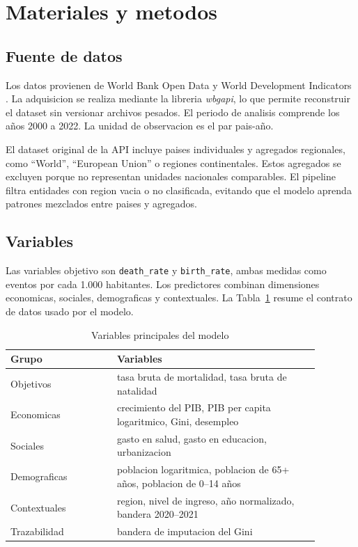 \documentclass[conference]{IEEEtran}
\begin{document}
\section{Materiales y metodos}

\subsection{Fuente de datos}

Los datos provienen de World Bank Open Data y World Development Indicators \cite{worldbank2024wdi}. La adquisicion se realiza mediante la libreria \textit{wbgapi}, lo que permite reconstruir el dataset sin versionar archivos pesados. El periodo de analisis comprende los años 2000 a 2022. La unidad de observacion es el par pais-año.

El dataset original de la API incluye paises individuales y agregados regionales, como ``World'', ``European Union'' o regiones continentales. Estos agregados se excluyen porque no representan unidades nacionales comparables. El pipeline filtra entidades con region vacia o no clasificada, evitando que el modelo aprenda patrones mezclados entre paises y agregados.

\subsection{Variables}

Las variables objetivo son \texttt{death\_rate} y \texttt{birth\_rate}, ambas medidas como eventos por cada 1.000 habitantes. Los predictores combinan dimensiones economicas, sociales, demograficas y contextuales. La Tabla~\ref{tab:variables} resume el contrato de datos usado por el modelo.

\begin{table}[htbp]
\caption{Variables principales del modelo}
\label{tab:variables}
\centering
\begin{tabular}{p{0.30\linewidth}p{0.58\linewidth}}
\toprule
\textbf{Grupo} & \textbf{Variables} \\
\midrule
Objetivos & tasa bruta de mortalidad, tasa bruta de natalidad \\
Economicas & crecimiento del PIB, PIB per capita logaritmico, Gini, desempleo \\
Sociales & gasto en salud, gasto en educacion, urbanizacion \\
Demograficas & poblacion logaritmica, poblacion de 65+ años, poblacion de 0--14 años \\
Contextuales & region, nivel de ingreso, año normalizado, bandera 2020--2021 \\
Trazabilidad & bandera de imputacion del Gini \\
\bottomrule
\end{tabular}
\end{table}
\end{document}

